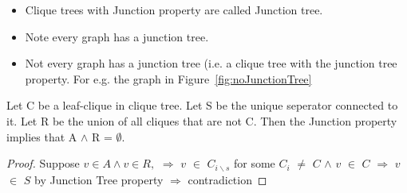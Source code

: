 \documentclass[12pt]{report}
\begin{document}
\begin{itemize}
\item Clique trees with Junction property are called Junction tree.
\item Note every graph has a junction tree.
\item Not every graph has a junction tree (i.e. a clique tree with the junction tree property. For e.g. the graph in Figure~\ref{fig:noJunctionTree}
\end{itemize}



\begin{lemma}
Let C be a leaf-clique in clique tree. Let S be the unique seperator connected to it. Let R be the union of all cliques that are not C. Then the Junction property implies that A $\land$ R = $\emptyset$.
\end{lemma}

\begin{proof}
Suppose $v \in A \land v \in R,$\newline
$\Rightarrow$ $v$ $\in$ $C_{i\backslash s}$ for some $C_{i}$ $\neq$ $C$ $\land$ $v$ $\in$ $C$\newline
$\Rightarrow$ $v$ $\in$ $S$ by Junction Tree property\newline
$\Rightarrow$ contradiction\newline
\end{proof}
\end{document}
